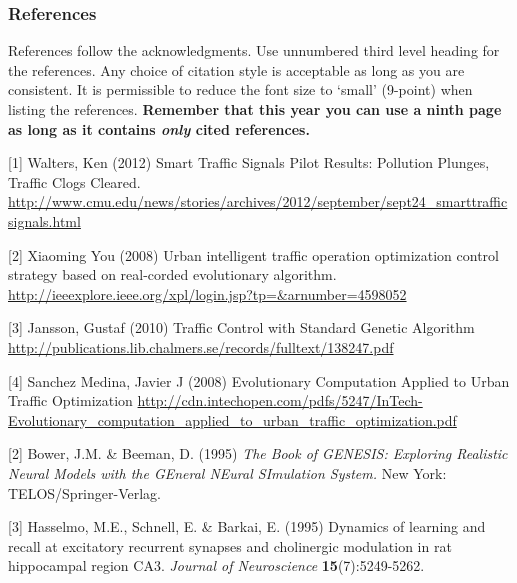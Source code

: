 \documentclass{article} %
\begin{document}
\subsubsection*{References}

References follow the acknowledgments. Use unnumbered third level heading for
the references. Any choice of citation style is acceptable as long as you are
consistent. It is permissible to reduce the font size to `small' (9-point) 
when listing the references. {\bf Remember that this year you can use
a ninth page as long as it contains \emph{only} cited references.}

\small{
[1] Walters, Ken (2012) Smart Traffic Signals Pilot Results: Pollution Plunges, Traffic Clogs Cleared. \url{http://www.cmu.edu/news/stories/archives/2012/september/sept24_smarttrafficsignals.html}

[2] Xiaoming You (2008) Urban intelligent traffic operation optimization control strategy based on real-corded evolutionary algorithm. \url{http://ieeexplore.ieee.org/xpl/login.jsp?tp=&arnumber=4598052}

[3] Jansson, Gustaf (2010) Traffic Control with Standard Genetic Algorithm \url{http://publications.lib.chalmers.se/records/fulltext/138247.pdf}

[4] Sanchez Medina, Javier J (2008) Evolutionary Computation Applied to Urban Traffic Optimization \url{http://cdn.intechopen.com/pdfs/5247/InTech-Evolutionary_computation_applied_to_urban_traffic_optimization.pdf}

[2] Bower, J.M. \& Beeman, D. (1995) {\it The Book of GENESIS: Exploring
Realistic Neural Models with the GEneral NEural SImulation System.}
New York: TELOS/Springer-Verlag.

[3] Hasselmo, M.E., Schnell, E. \& Barkai, E. (1995) Dynamics of learning
and recall at excitatory recurrent synapses and cholinergic modulation
in rat hippocampal region CA3. {\it Journal of Neuroscience}
{\bf 15}(7):5249-5262.
}
\end{document}
